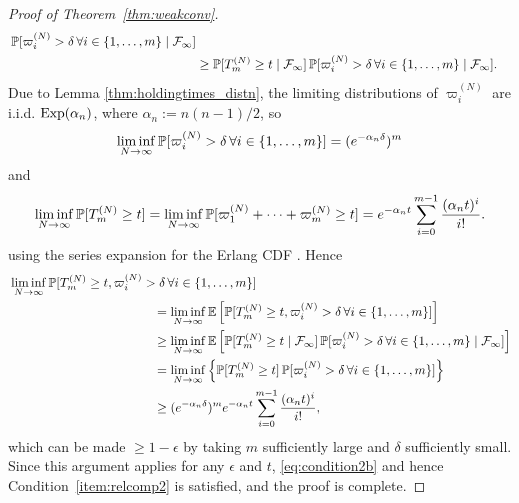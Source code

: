 \begin{proof}[Proof of Theorem~\ref{thm:weakconv}]
\begin{align*}
        \,\mathbb{P}[ \varpi_i^{(N)} > \delta \,\forall i\in \{1,\dots,m\} 
        \mid \mathcal{F}_\infty ] \\
&\geq \mathbb{P}[ T_m^{(N)} \geq t \mid \mathcal{F}_\infty ]
        \,\mathbb{P}[ \varpi_i^{(N)} > \delta \,\forall i\in \{1,\dots,m\} 
        \mid \mathcal{F}_\infty ] .
\end{align*}
Due to Lemma \ref{thm:holdingtimes_distn}, the limiting distributions of $\varpi_i^{(N)}$ are i.i.d. $\operatorname{Exp}(\alpha_n)$, where $\alpha_n := n(n-1)/2$, so
\begin{equation*}
\liminf_{N\to\infty} \mathbb{P}[ \varpi_i^{(N)} > \delta \,\forall i\in \{1,\dots,m\} ]
= (e^{-\alpha_n \delta})^m
\end{equation*}
and
\begin{equation*}
\liminf_{N\to\infty} \mathbb{P}[ T_m^{(N)} \geq t ]
= \liminf_{N\to\infty} \mathbb{P}[ \varpi_1^{(N)} + \cdots + \varpi_m^{(N)} \geq t ]
= e^{-\alpha_n t} \sum_{i=0}^{m-1} \frac{(\alpha_n t)^i}{i!} .
\end{equation*}
using the series expansion for the Erlang CDF \parencite[see for example][Chapter 15]{forbes2011}.
Hence 
\begin{align*}
&\liminf_{N\to\infty} 
        \Prob[ T_m^{(N)} \geq t, \varpi_i^{(N)} > \delta \,\forall i\in \{1,\dots,m\} ] \\
&\hspace{4cm}= \liminf_{N\to\infty} \E\left[ \Prob[ T_m^{(N)} \geq t, 
        \varpi_i^{(N)} > \delta \,\forall i\in \{1,\dots,m\} ] \right] \\
&\hspace{4cm}\geq \liminf_{N\to\infty} \E\left[ \Prob[ T_m^{(N)} \geq t 
        \mid \mathcal{F}_\infty ]
        \,\Prob[ \varpi_i^{(N)} > \delta \,\forall i\in \{1,\dots,m\} 
        \mid \mathcal{F}_\infty ] \right] \\
&\hspace{4cm}= \liminf_{N\to\infty} \left\{ \Prob[ T_m^{(N)} \geq t ]
        \,\Prob[ \varpi_i^{(N)} > \delta \,\forall i\in \{1,\dots,m\} ] \right\} \\
&\hspace{4cm}\geq (e^{-\alpha_n \delta})^m e^{-\alpha_n t} \sum_{i=0}^{m-1} 
        \frac{(\alpha_n t)^i}{i!} ,
\end{align*}
which can be made $\geq 1-\epsilon$ by taking $m$ sufficiently large and $\delta$ sufficiently small.
Since this argument applies for any $\epsilon$ and $t$, \eqref{eq:condition2b} and hence Condition~\ref{item:relcomp2} is satisfied, and the proof is complete.
\end{proof}




